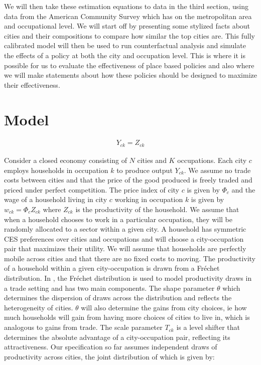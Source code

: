 \documentclass[10pt]{article}
\begin{document}
We will then take these estimation equations to data in the third section, using data from the American Community Survey which has on the metropolitan area and occupational level. We will start off by presenting some stylized facts about cities and their compositions to compare how similar the top cities are. This fully calibrated model will then be used to run counterfactual analysis and simulate the effects of a policy at both the city and occupation level. This is where it is possible for us to evaluate the effectiveness of place based policies and also where we will make statements about how these policies should be designed to maximize their effectiveness.

\section{Model}

\begin{align*}
    Y_{ck} = Z_{ck}
\end{align*}

Consider a closed economy consisting of $N$ cities and $K$ occupations. Each city $c$ employs households in occupation $k$ to produce output $Y_{ck}$. We assume no trade costs between cities and that the price of the good produced is freely traded and priced under perfect competition. The price index of city $c$ is given by $\Phi_c$ and the wage of a household living in city $c$ working in occupation $k$ is given by $w_{ck} = \Phi_c Z_{ck}$ where $Z_{ck}$ is the productivity of the household. We assume that when a household chooses to work in a particular occupation, they will be randomly allocated to a sector within a given city. A household has symmetric CES preferences over cities and occupations and will choose a city-occupation pair that maximizes their utility. We will assume that households are perfectly mobile across cities and that there are no fixed costs to moving. The productivity of a household within a given city-occupation is drawn from a Fr\'{e}chet distribution. In \cite{ek}, the Fr\'{e}chet distribution is used to model productivity draws in a trade setting and has two main components. The shape parameter $\theta$ which determines the dispersion of draws across the distribution and reflects the heterogeneity of cities. $\theta$ will also determine the gains from city choices, ie how much households will gain from having more choices of cities to live in, which is analogous to gains from trade. The scale parameter $T_{ck}$ is a level shifter that determines the absolute advantage of a city-occupation pair, reflecting its attractiveness. Our specification so far assumes independent draws of productivity across cities, the joint distribution of which is given by:
\end{document}
